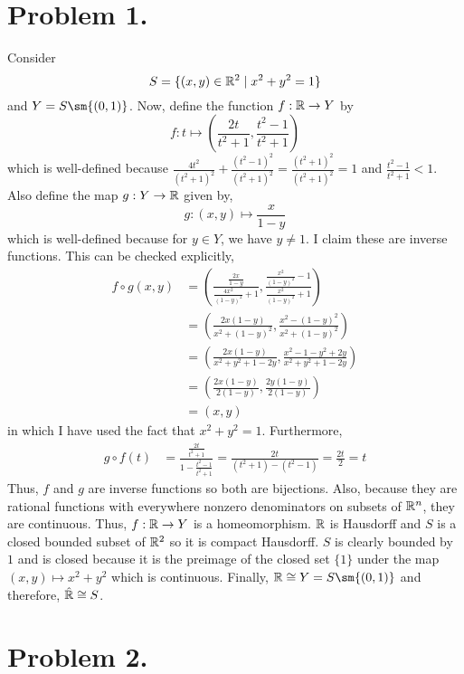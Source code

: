 \documentclass[12pt]{extarticle}
\begin{document}
 
\section*{Problem 1.}
Consider 
\[S = \{ (x, y) \in \mathbb{R}^2 \mid x^2 + y^2 = 1 \} \] and $Y = S \sm \{(0,1)\}$. Now, define the function $f : \mathbb{R} \to Y$ by \[f : t \mapsto \left( \frac{2 t}{t^2 + 1}, \frac{t^2 - 1}{t^2 + 1}  \right)\]
which is well-defined because $\frac{4t^2}{(t^2 + 1)^2} + \frac{(t^2 - 1)^2}{(t^2 + 1)^2} = \frac{(t^2 + 1)^2}{(t^2 + 1)^2} = 1$ and $\frac{t^2 - 1}{t^2 + 1} < 1$. Also define the map $g : Y \to \mathbb{R}$ given by,
\[g : (x, y) \mapsto \frac{x}{1 - y}\]
which is well-defined  because for $y \in Y$, we have $y \neq 1$. I claim these are inverse functions. This can be checked explicitly,
\begin{align*}
f \circ g (x, y) & = \left( \frac{\frac{2x}{1-y}}{\frac{4x^2}{(1-y)^2} + 1}, \frac{\frac{x^2}{(1-y)^2} - 1}{\frac{x^2}{(1-y)^2} + 1}  \right)  \\
& = \left( \frac{2x(1- y)}{x^2 + (1-y)^2}, \frac{x^2 - (1-y)^2}{x^2 + (1-y)^2}  \right)  \\
 & = \left( \frac{2x(1- y)}{x^2 + y^2 + 1 - 2y}, \frac{x^2 - 1 - y^2 + 2y}{x^2 + y^2 + 1 - 2y}  \right) \\
  & = \left( \frac{2x(1- y)}{2(1-y)}, \frac{2y(1-y)}{2(1-y)}  \right) \\
  & = \left(x, y \right)
\end{align*}
in which I have used the fact that $x^2 + y^2 = 1$.
Furthermore, 
\begin{align*}
g \circ f (t) &= \frac{\frac{2t}{t^2 + 1}}{1 - \frac{t^2 - 1}{t^2 +1}}
= \frac{2t}{(t^2 + 1) - (t^2 - 1)} = \frac{2t}{2} = t
\end{align*}
Thus, $f$ and $g$ are inverse functions so both are bijections. Also, because they are rational functions with everywhere nonzero denominators on subsets of $\mathbb{R}^n$, they are continuous. Thus, $f : \mathbb{R} \to Y$ is a homeomorphism. $\mathbb{R}$ is Hausdorff and $S$ is a closed bounded subset of $\mathbb{R}^2$ so it is compact Hausdorff. $S$ is clearly bounded by $1$ and is closed because it is the preimage of the closed set $\{1\}$ under the map $(x,y) \mapsto x^2 + y^2$ which is continuous. Finally, $\R \cong Y = S \sm \{(0,1)\}$ and therefore, $\hat{\mathbb{R}} \cong S$. 

\section*{Problem 2.}
\end{document}
